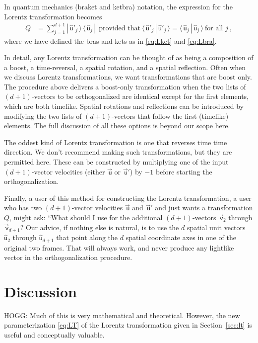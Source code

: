\documentclass{article}
\newcommand\upvec[1]{\!\vec{\,\mathrm{#1}}}
\newcommand{\Lvec}[1]{\upvec{\mathsf{#1}}} %
\newcommand{\Lhat}[1]{\hat{\mathsf{#1}}} %
\newcommand{\braket}[2]{\langle\,{#1}\,|\,{#2}\,\rangle}
\newcommand{\ketbra}[2]{|\,{#1}\,\rangle\,\langle\,{#2}\,|}
\newcommand{\plus}{\!+\!} %
\newcommand{\secref}[1]{Section~\ref{#1}}
\begin{document}
In quantum mechanics (braket and ketbra) notation, the expression for the Lorentz transformation becomes
\begin{align}
    Q &= \sum_{j=1}^{d+1} \ketbra{\Lhat{u}'_j}{\Lhat{u}_j} ~~ \mbox{provided that} ~ \braket{\Lhat{u}'_j}{\Lhat{u}'_j} = \braket{\Lhat{u}_j}{\Lhat{u}_j} ~ \mbox{for all $j$} ~,
\end{align}
where we have defined the bras and kets as in \eqref{eq:Lket} and \eqref{eq:Lbra}.

In detail, any Lorentz transformation can be thought of as being a composition of a boost, a time-reversal, a spatial rotation, and a spatial reflection.
Often when we discuss Lorentz transformations, we want transformations that are boost only.
The procedure above delivers a boost-only transformation when the two lists of $(d\plus1)$-vectors to be orthogonalized are identical except for the first elements, which are both timelike.
Spatial rotations and reflections can be introduced by modifying the two lists of $(d\plus1)$-vectors that follow the first (timelike) elements.
The full discussion of all these options is beyond our scope here.

The oddest kind of Lorentz transformation is one that reverses time time direction.
We don't recommend making such transformations, but they are permitted here.
These can be constructed by multiplying one of the input $(d+1)$-vector velocities (either $\Lvec{u}$ or $\Lvec{u}'$) by $-1$ before starting the orthogonalization.

Finally, a user of this method for constructing the Lorentz transformation, a user who has two $(d\plus1)$-vector velocities $\Lvec{u}$ and $\Lvec{u}'$ and just wants a transformation $Q$, might ask: ``What should I use for the additional $(d\plus1)$-vectors $\Lvec{v}_2$ through $\Lvec{v}_{d+1}$?
Our advice, if nothing else is natural, is to use the $d$ spatial unit vectors $\Lhat{u}_2$ through $\Lhat{u}_{d+1}$ that point along the $d$ spatial coordinate axes in one of the original two frames.
That will always work, and never produce any lightlike vector in the orthogonalization procedure.

\section{Discussion}\label{sec:discussion}

HOGG: Much of this is very mathematical and theoretical.
However, the new parameterization \eqref{eq:LT} of the Lorentz transformation given in \secref{sec:lt} is useful and conceptually valuable.
\end{document}
